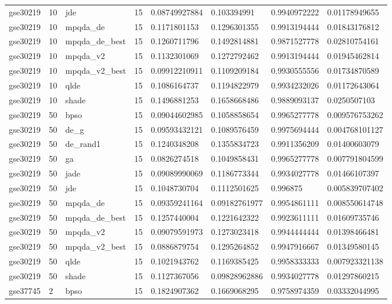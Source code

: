 \begin{table}[t]
\begin{tabular}{llllllll}
gse30219 & 10 & jde & 15 & 0.08749927884 & 0.103394991 & 0.9940972222 & 0.01178949655 \\
gse30219 & 10 & mpqda\_de & 15 & 0.1171801153 & 0.1296301355 & 0.9913194444 & 0.01843176812 \\
gse30219 & 10 & mpqda\_de\_best & 15 & 0.1260711796 & 0.1492814881 & 0.9871527778 & 0.02810754161 \\
gse30219 & 10 & mpqda\_v2 & 15 & 0.1132301069 & 0.1272792462 & 0.9913194444 & 0.01945462814 \\
gse30219 & 10 & mpqda\_v2\_best & 15 & 0.09912210911 & 0.1109209184 & 0.9930555556 & 0.01734870589 \\
gse30219 & 10 & qlde & 15 & 0.1086164737 & 0.1194822979 & 0.9934232026 & 0.01172643064 \\
gse30219 & 10 & shade & 15 & 0.1496881253 & 0.1658668486 & 0.9889093137 & 0.0250507103 \\
gse30219 & 50 & bpso & 15 & 0.09044602985 & 0.1058858654 & 0.9965277778 & 0.009576753262 \\
gse30219 & 50 & de\_g & 15 & 0.09593432121 & 0.1089576459 & 0.9975694444 & 0.004768101127 \\
gse30219 & 50 & de\_rand1 & 15 & 0.1240348208 & 0.1355834723 & 0.9911356209 & 0.01400603079 \\
gse30219 & 50 & ga & 15 & 0.0826274518 & 0.1049858431 & 0.9965277778 & 0.007791804599 \\
gse30219 & 50 & jade & 15 & 0.09089990069 & 0.1186773344 & 0.9934027778 & 0.01466107397 \\
gse30219 & 50 & jde & 15 & 0.1048730704 & 0.1112501625 & 0.996875 & 0.005839707402 \\
gse30219 & 50 & mpqda\_de & 15 & 0.09359241164 & 0.09182761977 & 0.9954861111 & 0.008550614748 \\
gse30219 & 50 & mpqda\_de\_best & 15 & 0.1257440004 & 0.1221642322 & 0.9923611111 & 0.01609735746 \\
gse30219 & 50 & mpqda\_v2 & 15 & 0.09079591973 & 0.1273023418 & 0.9944444444 & 0.01398466481 \\
gse30219 & 50 & mpqda\_v2\_best & 15 & 0.0886879754 & 0.1295264852 & 0.9947916667 & 0.01349580145 \\
gse30219 & 50 & qlde & 15 & 0.1021943762 & 0.1169385425 & 0.9958333333 & 0.007923321138 \\
gse30219 & 50 & shade & 15 & 0.1127367056 & 0.09828962886 & 0.9934027778 & 0.01297860215 \\
gse37745 & 2 & bpso & 15 & 0.1824907362 & 0.1669068295 & 0.9758974359 & 0.03332044995 \\

\end{tabular}
\end{table}
